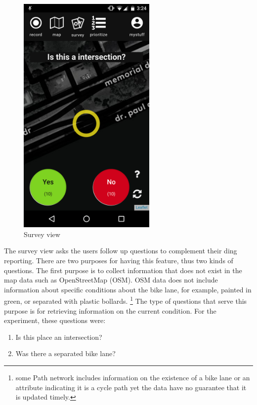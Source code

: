 \begin{figure}[htb]
  \includegraphics[width=0.6\textwidth]{chapters/4/fig/interface_survey.png}               
  \caption[interface: Survey]{Survey view}
  \label{fig:interface_survey}
\end{figure}

The survey view asks the users follow up questions to complement their ding reporting. There are two purposes for having this feature, thus two kinds of questions. The first purpose is to collect information that does not exist in the map data such as OpenStreetMap (OSM). OSM data does not include information about specific conditions
about the bike lane, for example, painted in green, or separated with plastic bollards.
\footnote{
 some Path network includes information on the existence of a bike
 lane or an attribute indicating it is a cycle path yet the data have no
 guarantee that it is updated timely.
} 
The type of questions that serve this purpose is for retrieving information on the current condition. For the experiment, these questions were:

\begin{enumerate}
  \item Is this place an intersection?
  \item Was there a separated bike lane?
\end{enumerate}


